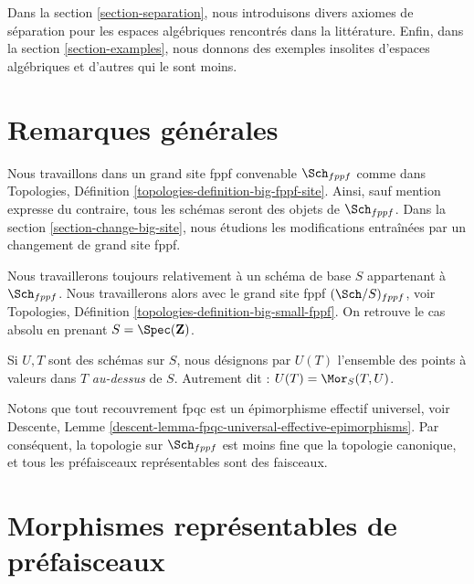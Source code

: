 \medskip\noindent
Dans la section \ref{section-separation}, nous introduisons divers axiomes
de séparation pour les espaces algébriques rencontrés dans la littérature.
Enfin, dans la section \ref{section-examples},
nous donnons des exemples insolites d'espaces algébriques et d'autres qui le sont moins.






\section{Remarques générales}
\label{section-general}

\noindent
Nous travaillons dans un grand site fppf convenable $\Sch_{fppf}$
comme dans Topologies, Définition \ref{topologies-definition-big-fppf-site}.
Ainsi, sauf mention expresse du contraire, tous les schémas seront des objets
de $\Sch_{fppf}$.
Dans la section \ref{section-change-big-site}, nous étudions les modifications
entraînées par un changement de grand site fppf.

\medskip\noindent
Nous travaillerons toujours relativement à un schéma de base $S$ appartenant à $\Sch_{fppf}$.
Nous travaillerons alors avec le grand site fppf $(\Sch/S)_{fppf}$,
voir Topologies, Définition \ref{topologies-definition-big-small-fppf}.
On retrouve le cas absolu en prenant
$S = \Spec(\mathbf{Z})$.

\medskip\noindent
Si $U, T$ sont des schémas sur $S$, nous désignons
par $U(T)$ l'ensemble des points à valeurs dans $T$ {\it au-dessus} de $S$.
Autrement dit : $U(T) = \Mor_S(T, U)$.

\medskip\noindent
Notons que tout recouvrement fpqc est un épimorphisme effectif universel, voir
Descente, Lemme \ref{descent-lemma-fpqc-universal-effective-epimorphisms}.
Par conséquent, la topologie sur $\Sch_{fppf}$
est moins fine que la topologie canonique, et tous les préfaisceaux représentables
sont des faisceaux.







\section{Morphismes représentables de préfaisceaux}
\label{section-representable}

